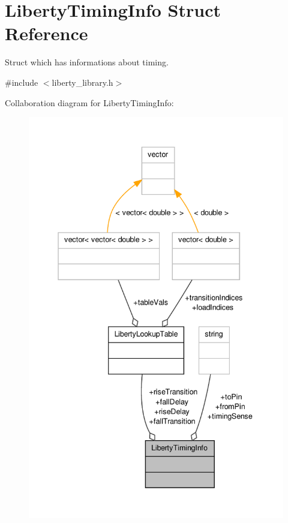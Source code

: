 \hypertarget{structLibertyTimingInfo}{\section{Liberty\-Timing\-Info Struct Reference}
\label{structLibertyTimingInfo}
}


Struct which has informations about timing.  




{\ttfamily \#include $<$liberty\-\_\-library.\-h$>$}



Collaboration diagram for Liberty\-Timing\-Info\-:\nopagebreak
\begin{figure}[H]
\begin{center}
\leavevmode
\includegraphics[width=340pt]{structLibertyTimingInfo__coll__graph}
\end{center}
\end{figure}

